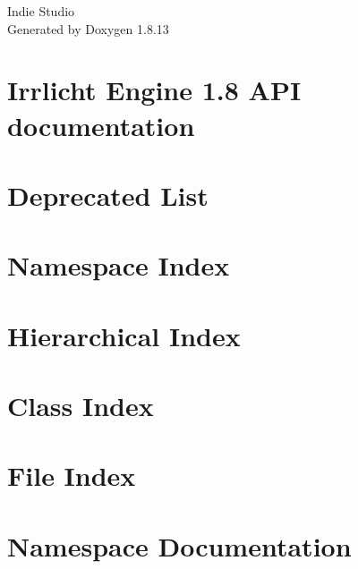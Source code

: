 \documentclass[twoside]{book}
\newcommand{\+}{\discretionary{\mbox{\scriptsize$\hookleftarrow$}}{}{}}
\newcommand{\clearemptydoublepage}{%
  \newpage{\pagestyle{empty}\cleardoublepage}%
}
\begin{document}
\hypersetup{pageanchor=false,
             bookmarksnumbered=true,
             pdfencoding=unicode
            }
\begin{titlepage}
\vspace*{7cm}
\begin{center}%
{\Large Indie Studio }\\
\vspace*{1cm}
{\large Generated by Doxygen 1.8.13}\\
\end{center}
\end{titlepage}
\clearemptydoublepage
{}
\tableofcontents
\clearemptydoublepage
{}
\hypersetup{pageanchor=true}

\chapter{Irrlicht Engine 1.8 A\+PI documentation}
\label{index}\hypertarget{index}{}
\chapter{Deprecated List}
\label{deprecated}

\chapter{Namespace Index}

\chapter{Hierarchical Index}

\chapter{Class Index}

\chapter{File Index}

\chapter{Namespace Documentation}






\end{document}
